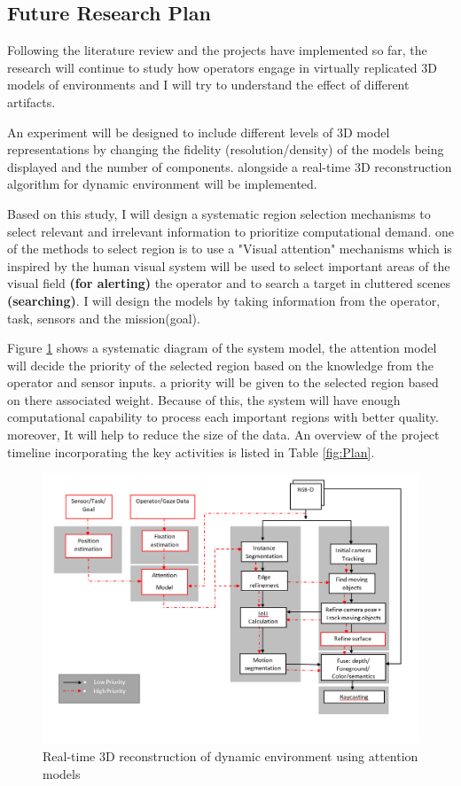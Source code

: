 \subsection*{Future Research Plan}

Following the literature review and the projects have implemented so far, the research will continue to study how operators engage in virtually replicated 3D models of environments and I will try to understand the effect of different artifacts.

An experiment will be designed to include different levels of 3D model representations by changing the fidelity (resolution/density) of the models being displayed and the number of components. alongside a real-time 3D reconstruction algorithm for dynamic environment will be implemented. 

Based on this study, I will design a systematic region selection mechanisms to select relevant and irrelevant information to prioritize computational demand. one of the methods to select region is to use a "Visual attention" mechanisms which is inspired by the human visual system will be used to select important areas of the visual field \textbf{(for alerting)} the operator and to search a target in cluttered scenes \textbf{(searching)}. I will design the models by taking information from the operator, task, sensors and the mission(goal). 

Figure \ref{fig:Attention} shows a systematic diagram of the system model, the attention model will decide the priority of the selected region based on the knowledge from the operator and sensor inputs. a priority will be given to the selected region based on there associated weight. Because of this, the system will have enough computational capability to process each important regions with better quality. moreover, It will help to reduce the size of the data. An overview of the project timeline incorporating the key activities is listed in Table \ref{fig:Plan}.

\begin{figure}[h]
    \centering
    \includegraphics[scale=0.55]{images/Dyn_Reco_Attention.PNG}
    \caption{Real-time 3D reconstruction of dynamic environment using attention models}
    \label{fig:Attention}
\end{figure}

